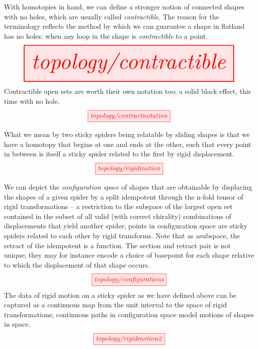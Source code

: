 \begin{myboxB}
\begin{defn}[Contractibility]\label{defn:contractible}
With homotopies in hand, we can define a stronger notion of connected shapes with no holes, which are usually called \emph{contractible}. The reason for the terminology reflects the method by which we can guarantee a shape in flatland has no holes: when any loop in the shape is \emph{contractible} to a point.
\[\resizebox{\textwidth}{!}{\tikzfig{topology/contractible}}\]
Contractible open sets are worth their own notation too; a solid black effect, this time with no hole.
\[\tikzfig{topology/contractnotation}\]
\end{defn}
\end{myboxB}

\begin{myboxR}
\begin{defn}\label{defn:sliding}
What we mean by two sticky spiders being relatable by sliding shapes is that we have a homotopy that begins at one and ends at the other, such that every point in between is itself a sticky spider related to the first by rigid displacement.
\[\tikzfig{topology/rigidmotion}\]
\end{defn}
\end{myboxR}

\begin{myboxB}
\begin{defn}\label{defn:configurationspace}
We can depict the \emph{configuration space} of shapes that are obtainable by displacing the shapes of a given spider by a split idempotent through the n-fold tensor of rigid transformations -- a restriction to the subspace of the largest open set contained in the subset of all valid (with correct chirality) combinations of displacements that yield another spider; points in configuration space are sticky spiders related to each other by rigid transforms. Note that as asubspace, the retract of the idempotent is a function. The section and retract pair is not unique; they may for instance encode a choice of basepoint for each shape relative to which the displacement of that shape occurs.
\[\tikzfig{topology/configurations}\]
The data of rigid motion on a sticky spider as we have defined above can be captured as a continuous map from the unit interval to the space of rigid transformations; continuous paths in configuration space model motions of shapes in space.
\[\tikzfig{topology/rigidmotion2}\]
\end{defn}
\end{myboxB}

